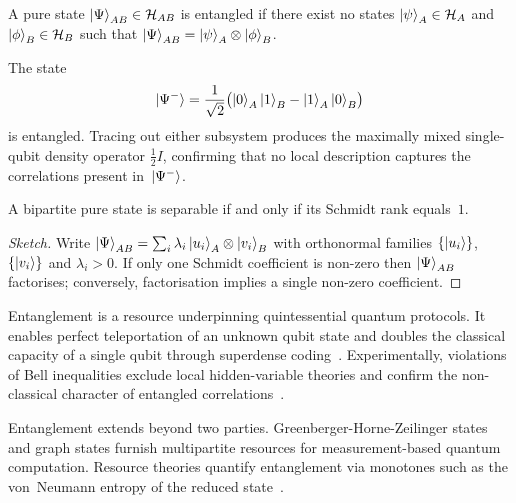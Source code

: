  \begin{definition}\label{def:entangled}
   A pure state $\ket{\Psi}_{AB}\in\mathcal H_{AB}$ is entangled if there exist no states $\ket{\psi}_A\in\mathcal H_A$ and $\ket{\phi}_B\in\mathcal H_B$ such that $\ket{\Psi}_{AB}=\ket{\psi}_A\otimes\ket{\phi}_B$.
 \end{definition}
 
 \begin{example}
   The state
   \[
     \ket{\Psi^-}=\frac1{\sqrt2}\bigl(\ket{0}_A\ket{1}_B-\ket{1}_A\ket{0}_B\bigr)
   \]
   is entangled.  
   Tracing out either subsystem produces the maximally mixed single-qubit density operator $\frac12I$, confirming that no local description captures the correlations present in~$\ket{\Psi^-}$.
 \end{example}
 
 \begin{proposition}
   A bipartite pure state is separable if and only if its Schmidt rank equals~$1$.
 \end{proposition}
 
 \begin{proof}[Sketch]
   Write $\ket{\Psi}_{AB}=\sum_i\lambda_i\ket{u_i}_A\otimes\ket{v_i}_B$ with orthonormal families $\{\ket{u_i}\}$, $\{\ket{v_i}\}$ and $\lambda_i>0$.  
   If only one Schmidt coefficient is non-zero then $\ket{\Psi}_{AB}$ factorises; conversely, factorisation implies a single non-zero coefficient.  
 \end{proof}
 
 
 Entanglement is a resource underpinning quintessential quantum protocols.  
 It enables perfect teleportation of an unknown qubit state and doubles the classical capacity of a single qubit through superdense coding~\cite{Bennett1993}.  
 Experimentally, violations of Bell inequalities exclude local hidden-variable theories and confirm the non-classical character of entangled correlations~\cite{Aspect1982}.  
 
 \begin{remark}
   Entanglement extends beyond two parties.  
   Greenberger-Horne-Zeilinger states and graph states furnish multipartite resources for measurement-based quantum computation.  
   Resource theories quantify entanglement via monotones such as the von~Neumann entropy of the reduced state~\cite{Horodecki2009}.
 \end{remark}
 
